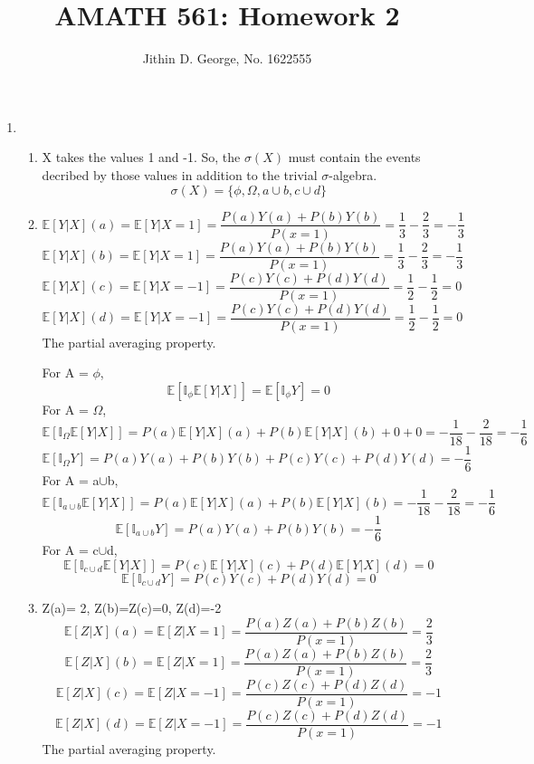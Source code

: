 \documentclass[a4paper,11pt]{article}
\title{AMATH 561: Homework 2}
\author{Jithin D. George, No. 1622555}
\begin{document}
\maketitle
\begin{enumerate}

	\item
	\begin{enumerate}\item
	X takes the values 1 and -1. So, the $\sigma(X)$ must contain the events decribed by those values in addition to the trivial $\sigma$-algebra.
	\[\sigma(X)= \{\phi, \Omega, a\cup b, c\cup d\}\]
	\item 
	
	\[\mathbb{E}[Y|X](a)= \mathbb{E}[Y|X=1]= \frac{P(a)Y(a) + P(b)Y(b)}{P(x=1)} =\frac{1}{3}- \frac{2}{3} =-\frac{1}{3}\]
	\[\mathbb{E}[Y|X](b)= \mathbb{E}[Y|X=1]= \frac{P(a)Y(a) + P(b)Y(b)}{P(x=1)} =\frac{1}{3}- \frac{2}{3} =-\frac{1}{3}\]
	\[\mathbb{E}[Y|X](c)= \mathbb{E}[Y|X=-1]= \frac{P(c)Y(c) + P(d)Y(d)}{P(x=1)} =\frac{1}{2}- \frac{1}{2} =0\]
	\[\mathbb{E}[Y|X](d)= \mathbb{E}[Y|X=-1]=\frac{P(c)Y(c) + P(d)Y(d)}{P(x=1)} =\frac{1}{2}- \frac{1}{2} =0\]
The partial averaging property.

For A = $\phi$,
\[\mathbb{E}[\mathbb{I}_\phi\mathbb{E}[Y|X]]=\mathbb{E}[\mathbb{I}_\phi Y] =0\]
For A = $\Omega$,
\[\mathbb{E}[\mathbb{I}_\Omega\mathbb{E}[Y|X]]=P(a)\mathbb{E}[Y|X](a)+ P(b)\mathbb{E}[Y|X](b) +0 +0=-\frac{1}{18}- \frac{2}{18}=-\frac{1}{6}\]
\[\mathbb{E}[\mathbb{I}_\Omega Y] = P(a)Y(a) + P(b)Y(b)+ P(c)Y(c) + P(d)Y(d)= -\frac{1}{6}\]
For A = a$\cup$b,
\[\mathbb{E}[\mathbb{I}_{a\cup b}\mathbb{E}[Y|X]]=P(a)\mathbb{E}[Y|X](a)+ P(b)\mathbb{E}[Y|X](b) =-\frac{1}{18}- \frac{2}{18}=-\frac{1}{6}\]
\[\mathbb{E}[\mathbb{I}_{a\cup b} Y] = P(a)Y(a) + P(b)Y(b)= -\frac{1}{6}\]
For A = c$\cup$d,
\[\mathbb{E}[\mathbb{I}_{c\cup d}\mathbb{E}[Y|X]]=P(c)\mathbb{E}[Y|X](c)+ P(d)\mathbb{E}[Y|X](d) =0\]
\[\mathbb{E}[\mathbb{I}_{c\cup d} Y] =P(c)Y(c) + P(d)Y(d)= 0\]
\item
Z(a)= 2, Z(b)=Z(c)=0, Z(d)=-2
	\[\mathbb{E}[Z|X](a)= \mathbb{E}[Z|X=1]= \frac{P(a)Z(a) + P(b)Z(b)}{P(x=1)} =\frac{2}{3}\]
	\[\mathbb{E}[Z|X](b)= \mathbb{E}[Z|X=1]= \frac{P(a)Z(a) + P(b)Z(b)}{P(x=1)} =\frac{2}{3}\]
	\[\mathbb{E}[Z|X](c)= \mathbb{E}[Z|X=-1]= \frac{P(c)Z(c) + P(d)Z(d)}{P(x=1)} =-1\]
	\[\mathbb{E}[Z|X](d)= \mathbb{E}[Z|X=-1]= \frac{P(c)Z(c) + P(d)Z(d)}{P(x=1)} =-1\]
The partial averaging property.


\end{enumerate}
\end{enumerate}
\end{document}
